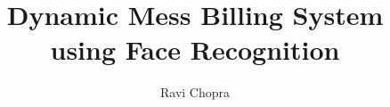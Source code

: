 \documentclass[defaultstyle,11pt]{thesis}
\title{Dynamic Mess Billing System using Face Recognition}
\author{Ravi Chopra}
\begin{document}
\listoffigures





% 


\nocite{*}		%

% 
% 
\end{document}
